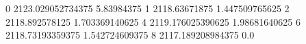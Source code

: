 0 2123.029052734375 5.83984375
1 2118.63671875 1.447509765625
2 2118.892578125 1.703369140625
4 2119.176025390625 1.98681640625
6 2118.73193359375 1.542724609375
8 2117.189208984375 0.0
